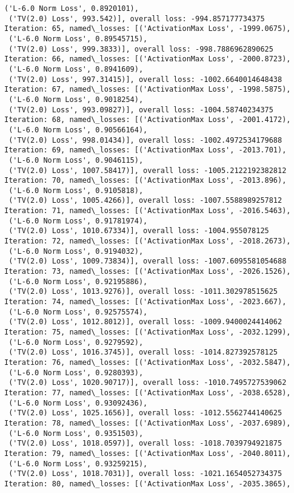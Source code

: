 \documentclass[10pt]{article}
\begin{document}
\begin{Verbatim}[commandchars=\\\{\}]
 ('L-6.0 Norm Loss', 0.8920101),
 ('TV(2.0) Loss', 993.542)], overall loss: -994.857177734375
Iteration: 65, named\_losses: [('ActivationMax Loss', -1999.0675),
 ('L-6.0 Norm Loss', 0.89545715),
 ('TV(2.0) Loss', 999.3833)], overall loss: -998.7886962890625
Iteration: 66, named\_losses: [('ActivationMax Loss', -2000.8723),
 ('L-6.0 Norm Loss', 0.8941609),
 ('TV(2.0) Loss', 997.31415)], overall loss: -1002.6640014648438
Iteration: 67, named\_losses: [('ActivationMax Loss', -1998.5875),
 ('L-6.0 Norm Loss', 0.9018254),
 ('TV(2.0) Loss', 993.09827)], overall loss: -1004.58740234375
Iteration: 68, named\_losses: [('ActivationMax Loss', -2001.4172),
 ('L-6.0 Norm Loss', 0.90566164),
 ('TV(2.0) Loss', 998.01434)], overall loss: -1002.4972534179688
Iteration: 69, named\_losses: [('ActivationMax Loss', -2013.701),
 ('L-6.0 Norm Loss', 0.9046115),
 ('TV(2.0) Loss', 1007.58417)], overall loss: -1005.2122192382812
Iteration: 70, named\_losses: [('ActivationMax Loss', -2013.896),
 ('L-6.0 Norm Loss', 0.9105818),
 ('TV(2.0) Loss', 1005.4266)], overall loss: -1007.5588989257812
Iteration: 71, named\_losses: [('ActivationMax Loss', -2016.5463),
 ('L-6.0 Norm Loss', 0.91781974),
 ('TV(2.0) Loss', 1010.67334)], overall loss: -1004.955078125
Iteration: 72, named\_losses: [('ActivationMax Loss', -2018.2673),
 ('L-6.0 Norm Loss', 0.9194032),
 ('TV(2.0) Loss', 1009.73834)], overall loss: -1007.6095581054688
Iteration: 73, named\_losses: [('ActivationMax Loss', -2026.1526),
 ('L-6.0 Norm Loss', 0.92195886),
 ('TV(2.0) Loss', 1013.9276)], overall loss: -1011.302978515625
Iteration: 74, named\_losses: [('ActivationMax Loss', -2023.667),
 ('L-6.0 Norm Loss', 0.92575574),
 ('TV(2.0) Loss', 1012.8012)], overall loss: -1009.9400024414062
Iteration: 75, named\_losses: [('ActivationMax Loss', -2032.1299),
 ('L-6.0 Norm Loss', 0.9279592),
 ('TV(2.0) Loss', 1016.3745)], overall loss: -1014.827392578125
Iteration: 76, named\_losses: [('ActivationMax Loss', -2032.5847),
 ('L-6.0 Norm Loss', 0.9280393),
 ('TV(2.0) Loss', 1020.90717)], overall loss: -1010.7495727539062
Iteration: 77, named\_losses: [('ActivationMax Loss', -2038.6528),
 ('L-6.0 Norm Loss', 0.93092436),
 ('TV(2.0) Loss', 1025.1656)], overall loss: -1012.5562744140625
Iteration: 78, named\_losses: [('ActivationMax Loss', -2037.6989),
 ('L-6.0 Norm Loss', 0.9351503),
 ('TV(2.0) Loss', 1018.0597)], overall loss: -1018.7039794921875
Iteration: 79, named\_losses: [('ActivationMax Loss', -2040.8011),
 ('L-6.0 Norm Loss', 0.93259215),
 ('TV(2.0) Loss', 1018.7031)], overall loss: -1021.1654052734375
Iteration: 80, named\_losses: [('ActivationMax Loss', -2035.3865),

\end{Verbatim}
\end{document}
